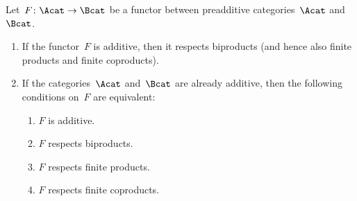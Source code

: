 \begin{theorem}
  \label{characterizations of additive functors}
  Let~$F \colon \Acat \to \Bcat$ be a functor between preadditive categories~$\Acat$ and~$\Bcat$.
  \begin{enumerate}
    \item
      \label{additive preserves biproducts}
      If the functor~$F$ is additive, then it respects biproducts (and hence also finite products and finite coproducts).
    \item
      If the categories~$\Acat$ and~$\Bcat$ are already additive, then the following conditions on~$F$ are equivalent:
      \begin{enumerate}
        \item
          \label{is additive}
          $F$ is additive.
        \item
          \label{respects biproducts}
          $F$ respects biproducts.
        \item
          \label{respects finite products}
          $F$ respects finite products.
        \item
          \label{respects finite coproducts}
          $F$ respects finite coproducts.
      \end{enumerate}
  \end{enumerate}
\end{theorem}


